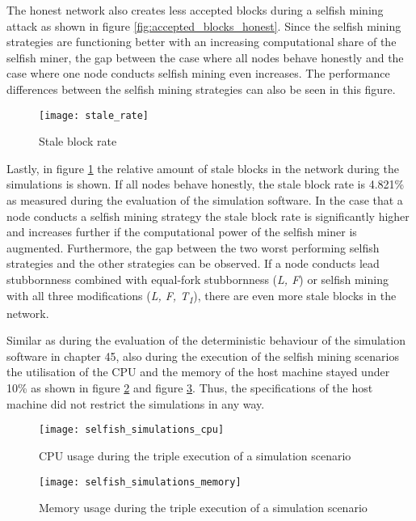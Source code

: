 The honest network also creates less accepted blocks during a selfish mining attack as shown in figure \ref{fig:accepted_blocks_honest}.
Since the selfish mining strategies are functioning better with an increasing computational share of the selfish miner, the gap between the case where all nodes behave honestly and the case where one node conducts selfish mining even increases.
The performance differences between the selfish mining strategies can also be seen in this figure.

\begin{figure}[t]
\texttt{[image: stale\_rate]}
\centering
\caption{Stale block rate}
\label{fig:stale_rate}
\end{figure}

Lastly, in figure \ref{fig:stale_rate} the relative amount of stale blocks in the network during the simulations is shown.
If all nodes behave honestly, the stale block rate is 4.821\% as measured during the evaluation of the simulation software.
In the case that a node conducts a selfish mining strategy the stale block rate is significantly higher and increases further if the computational power of the selfish miner is augmented.
Furthermore, the gap between the two worst performing selfish strategies and the other strategies can be observed.
If a node conducts lead stubbornness combined with equal-fork stubbornness (\textit{L, F}) or selfish mining with all three modifications (\textit{L, F, T\textsubscript{1}}), there are even more stale blocks in the network.

Similar as during the evaluation of the deterministic behaviour of the simulation software in chapter 45, also during the execution of the selfish mining scenarios the utilisation of the CPU and the memory of the host machine stayed under 10\% as shown in figure \ref{fig:selfish_simulations_cpu} and figure \ref{fig:selfish_simulations_memory}.
Thus, the specifications of the host machine did not restrict the simulations in any way.

\begin{figure}[t]
\texttt{[image: selfish\_simulations\_cpu]}
\centering
\caption{CPU usage during the triple execution of a simulation scenario}
\label{fig:selfish_simulations_cpu}
\end{figure}

\begin{figure}[t]
\texttt{[image: selfish\_simulations\_memory]}
\centering
\caption{Memory usage during the triple execution of a simulation scenario}
\label{fig:selfish_simulations_memory}
\end{figure}
